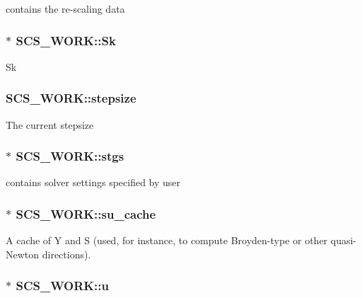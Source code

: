 contains the re-\/scaling data \hypertarget{struct_s_c_s___w_o_r_k_a7cca350a27cb51159173625c33c612a8}{
\subsubsection[{Sk}]{$\ast$ S\-C\-S\-\_\-\-W\-O\-R\-K\-::\-Sk}}\label{struct_s_c_s___w_o_r_k_a7cca350a27cb51159173625c33c612a8}
Sk \hypertarget{struct_s_c_s___w_o_r_k_ac5a727ef1efb0420f4cffa873f30eacd}{
\subsubsection[{stepsize}]{ S\-C\-S\-\_\-\-W\-O\-R\-K\-::stepsize}}\label{struct_s_c_s___w_o_r_k_ac5a727ef1efb0420f4cffa873f30eacd}
The current stepsize \hypertarget{struct_s_c_s___w_o_r_k_a4f48ab97dacf5c54b250752d2213c83c}{
\subsubsection[{stgs}]{$\ast$ S\-C\-S\-\_\-\-W\-O\-R\-K\-::stgs}}\label{struct_s_c_s___w_o_r_k_a4f48ab97dacf5c54b250752d2213c83c}
contains solver settings specified by user \hypertarget{struct_s_c_s___w_o_r_k_a868a7451f64464b0f2c6c053073998ed}{
\subsubsection[{su\-\_\-cache}]{$\ast$ S\-C\-S\-\_\-\-W\-O\-R\-K\-::su\-\_\-cache}}\label{struct_s_c_s___w_o_r_k_a868a7451f64464b0f2c6c053073998ed}
A cache of Y and S (used, for instance, to compute Broyden-\/type or other quasi-\/\-Newton directions). \hypertarget{struct_s_c_s___w_o_r_k_a991bc82cd3e84ce1ac7d3625b051a577}{
\subsubsection[{u}]{$\ast$ S\-C\-S\-\_\-\-W\-O\-R\-K\-::u}}\label{struct_s_c_s___w_o_r_k_a991bc82cd3e84ce1ac7d3625b051a577}
